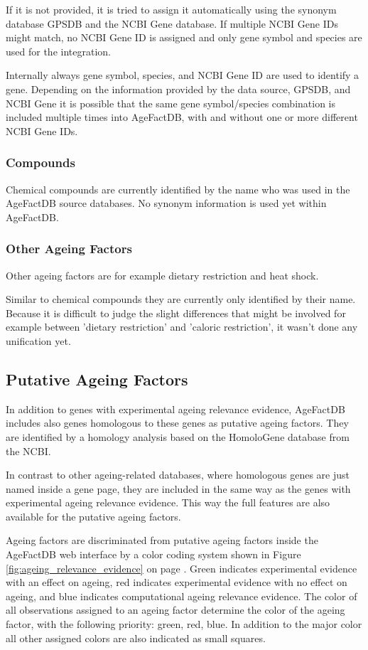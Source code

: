 \documentclass[12pt,a4paper,notitlepage,twoside]{report}
\begin{document}
If it is not provided, it is tried to assign it automatically using the synonym database GPSDB  and the NCBI Gene database. If multiple NCBI Gene IDs might match, no NCBI Gene ID is assigned and only gene symbol and species are used for the integration.

Internally always gene symbol, species, and NCBI Gene ID are used to identify a gene. Depending on the information provided by the data source, GPSDB, and NCBI Gene it is possible that the same gene symbol/species combination is included multiple times into AgeFactDB, with and without one or more different NCBI Gene IDs.

\subsubsection{Compounds}
Chemical compounds are currently identified by the name who was used in the AgeFactDB source databases. No synonym information is used yet within AgeFactDB.

\subsubsection{Other Ageing Factors}
Other ageing factors are for example dietary restriction and heat shock.

Similar to chemical compounds they are currently only identified by their name. Because it is difficult to judge the slight differences that might be involved for example between 'dietary restriction' and 'caloric restriction', it wasn't done any unification yet.

\subsection{Putative Ageing Factors}
\label{sec:putative_ageing_factors}
In addition to genes with experimental ageing relevance evidence, AgeFactDB includes also genes homologous to these genes as putative ageing factors. They are identified by a homology analysis based on the HomoloGene database from the NCBI.

In contrast to other ageing-related databases, where homologous genes are just named inside a gene page, they are included in the same way as the genes with experimental ageing relevance evidence. This way the full features are also available for the putative ageing factors. 

Ageing factors are discriminated from putative ageing factors inside the AgeFactDB web interface by a color coding system shown in Figure \ref{fig:ageing_relevance_evidence} on page \pageref{fig:ageing_relevance_evidence}. Green indicates experimental evidence with an effect on ageing, red indicates experimental evidence with no effect on ageing, and blue indicates computational ageing relevance evidence. The color of all observations assigned to an ageing factor determine the color of the ageing factor, with the following priority:  green, red, blue. In addition to the major color all other assigned colors are also indicated as small squares.
\end{document}
